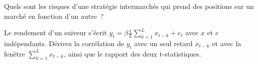 \begin{interviewq}\label{iq:s1:cross-asset-lead-lag:5}
Quels sont les risques d'une stratégie intermarchés qui prend des positions sur un marché en fonction d'un autre~?
\end{interviewq}

\begin{interviewq}\label{iq:s1:cross-asset-lead-lag:6}
Le rendement d'un suiveur s'écrit $y_t = \beta \frac{1}{L}\sum_{k=1}^{L} x_{t-k} + e_t$ avec $x$ et $e$ indépendants. Dérivez la corrélation de $y_t$ avec un seul retard
$x_{t-k}$ et avec la fenêtre $\sum_{k=1}^{L} x_{t-k}$, ainsi que le rapport des deux t-statistiques.
\end{interviewq}
